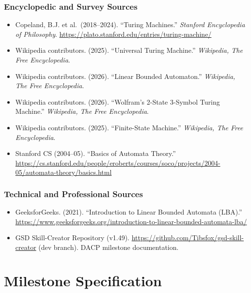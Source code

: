 \documentclass[11pt,letterpaper]{article}
\newcommand{\stageheader}[2]{%
  \noindent\colorbox{#2}{\makebox[\textwidth][l]{%
    \textcolor{white}{\bfseries\sffamily\hspace{6pt}#1\hspace{6pt}}}}%
  \vspace{0.5em}\par%
}
\begin{document}
\subsubsection{Encyclopedic and Survey Sources}
\begin{itemize}
  \item Copeland, B.J. et al.\ (2018--2024). ``Turing Machines.'' \textit{Stanford Encyclopedia of Philosophy}. \url{https://plato.stanford.edu/entries/turing-machine/}
  \item Wikipedia contributors. (2025). ``Universal Turing Machine.'' \textit{Wikipedia, The Free Encyclopedia}.
  \item Wikipedia contributors. (2026). ``Linear Bounded Automaton.'' \textit{Wikipedia, The Free Encyclopedia}.
  \item Wikipedia contributors. (2026). ``Wolfram's 2-State 3-Symbol Turing Machine.'' \textit{Wikipedia, The Free Encyclopedia}.
  \item Wikipedia contributors. (2025). ``Finite-State Machine.'' \textit{Wikipedia, The Free Encyclopedia}.
  \item Stanford CS (2004--05). ``Basics of Automata Theory.'' \url{https://cs.stanford.edu/people/eroberts/courses/soco/projects/2004-05/automata-theory/basics.html}
\end{itemize}

\subsubsection{Technical and Professional Sources}
\begin{itemize}
  \item GeeksforGeeks. (2021). ``Introduction to Linear Bounded Automata (LBA).'' \url{https://www.geeksforgeeks.org/introduction-to-linear-bounded-automata-lba/}
  \item GSD Skill-Creator Repository (v1.49). \url{https://github.com/Tibsfox/gsd-skill-creator} (dev branch). DACP milestone documentation.
\end{itemize}

\newpage
\stageheader{STAGE 3 --- MISSION PACKAGE}{tertiary}

\section{Milestone Specification}
\end{document}
